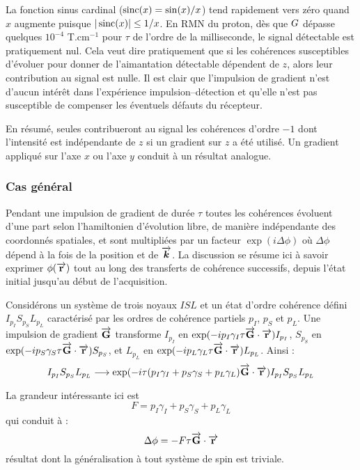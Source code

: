 La fonction sinus cardinal ($\operatorname{sinc}(x) = \sin(x)/x$) tend rapidement
vers zéro quand $x$ augmente puisque $|\operatorname{sinc}(x)| \leq 1/x$.
En RMN du proton, dès que $G$ dépasse quelques $10^{-4}$ T$.$cm$^{-1}$ pour $\tau$
de l'ordre de la milliseconde, le signal détectable est pratiquement nul.
Cela veut dire pratiquement que si les cohérences susceptibles d'évoluer
pour donner de l'aimantation détectable dépendent de $z$, alors leur contribution au signal
est nulle.
Il est clair que l'impulsion de gradient n'est d'aucun intérêt dans l'expérience
impulsion--détection et qu'elle n'est pas susceptible de compenser les éventuels
défauts du récepteur.

En résumé, seules contribueront au signal les cohérences d'ordre $-1$ dont l'intensité
est indépendante de $z$ si un gradient sur $z$ a été utilisé.
Un gradient appliqué sur l'axe $x$ ou l'axe $y$ conduit à un résultat analogue.

\subsubsection{Cas général}
Pendant une impulsion de gradient de durée $\tau$ toutes les cohérences évoluent
d'une part selon l'hamiltonien d'évolution libre, de manière indépendante
des coordonnés spatiales, et sont multipliées par un facteur $\exp(i\Delta\phi)$ où
$\Delta\phi$ dépend à la fois de la position et de $\overrightarrow{\boldsymbol{k}}$.
La discussion se résume ici à savoir exprimer $\phi(\overrightarrow{\mathbf{r}})$ tout au long des transferts
de cohérence successifs, depuis l'état initial jusqu'au début de l'acquisition.

Considérons un système de trois noyaux $ISL$ et un état d'ordre cohérence défini
$I_{p_I}S_{p_S}L_{p_L}$ caractérisé par les ordres de cohérence partiels
$p_I$, $p_S$ et $p_L$.
Une impulsion de gradient $\overrightarrow{\mathbf{G}}$ transforme 
$I_{p_I}$ en $\exp(-ip_I\gamma_I\tau\overrightarrow{\mathbf{G}}\cdot\overrightarrow{\mathbf{r}})I_{p_I}$,
$S_{p_S}$ en $\exp(-ip_S\gamma_S\tau\overrightarrow{\mathbf{G}}\cdot\overrightarrow{\mathbf{r}})S_{p_S}$, et
$L_{p_L}$ en $\exp(-ip_L\gamma_L\tau\overrightarrow{\mathbf{G}}\cdot\overrightarrow{\mathbf{r}})L_{p_L}$.
Ainsi :
\begin{equation}
I_{p_I}S_{p_S}L_{p_L} \longrightarrow
\exp(-i\tau(p_I\gamma_I + p_S\gamma_S + p_L\gamma_L)\overrightarrow{\mathbf{G}}\cdot\overrightarrow{\mathbf{r}})
I_{p_I}S_{p_S}L_{p_L}
\end{equation}

La grandeur intéressante ici est
\begin{equation}
\label{eqn:deff}
F = p_I\gamma_I + p_S\gamma_S + p_L\gamma_L
\end{equation}
qui conduit à :
\begin{equation}
\Delta\phi = -F\tau\overrightarrow{\mathbf{G}}\cdot\overrightarrow{\mathbf{r}}
\end{equation}
résultat dont la généralisation à tout système de spin est triviale.

